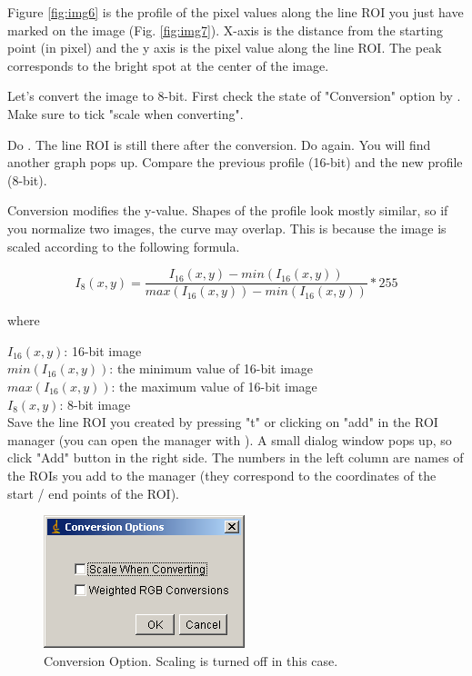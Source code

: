 \begin{indentexercise}{1}
Figure \ref{fig:img6} is the profile of the pixel values along the line ROI 
you just have marked on the image (Fig. \ref{fig:img7}). X-axis is the distance 
from the starting point (in pixel) and the y axis is the pixel value along the line ROI. 
The peak corresponds to the bright spot at the center of the image. 

Let's convert the image to 8-bit. First check the state
of "Conversion" option by
. Make
sure to tick "scale when
converting". 



Do . The line
ROI is still there after the conversion. Do again. 
You will find another graph pops up. Compare the previous profile (16-bit) and the new profile (8-bit).

Conversion modifies the y-value. Shapes of the profile look
mostly similar, so if you normalize two images, the curve may overlap.
This is because the image is scaled according to the following
formula.

\[
I_{8}(x,y) = \frac{I_{16}(x, y) - min(I_{16}(x,y))}{ max(I_{16}(x,y)) -  min(I_{16}(x,y))} *255
\]

where

$I_{16}(x, y)$: 16-bit image\\
$min(I_{16}(x,y))$: the minimum value of 16-bit image\\
$max(I_{16}(x,y))$: the maximum value of 16-bit image\\
$I_{8}(x, y)$: 8-bit image\\


Save the line ROI you created by pressing "t" or clicking on "add" in the ROI manager (you can open the manager with ). A small dialog window pops up, so
click "Add" button in the right side.
The numbers in the left column are names of the ROIs
you add to the manager (they correspond to the coordinates of the start / end points of the ROI).

\begin{figure}[htbp]
\begin{center}
\includegraphics[width=5.847cm,height=3.863cm]{fig/CMCIBasicCourse201102-img8.png}
\caption{Conversion Option. Scaling is turned off in this case. }
\label{fig:img8}
\end{center}
\end{figure}


\end{indentexercise}

